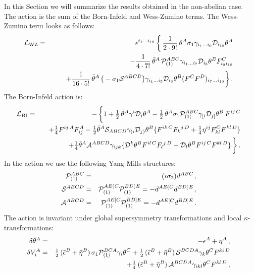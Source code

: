 \documentclass[12pt,a4paper]{article}
\def\half{{\textstyle {1 \over 2}}}
\def\quart{{\textstyle {1 \over 4}}}
\def\noverm#1#2{{\textstyle {#1 \over #2}}}
\def\Dpartial{{\cal D}}
\begin{document}
In this Section we will summarize the results obtained in the
non-abelian case.
The action is the sum of the Born-Infeld and Wess-Zumino terms.
The Wess-Zumino term looks as follows:
\begin{eqnarray}
    {\cal L}_{{\rm WZ}} &=& \epsilon^{i_1\ldots i_{10}} \,
     \bigg\{ \, {1\over 2\cdot 9!}\,\bar\theta^A\sigma_1
   \gamma_{i_1\ldots i_9}\Dpartial_{i_{10}}\theta^A
   \nonumber\\
   &&\quad - {1\over 4\cdot 7!}\,\bar\theta^A \, {\cal P}^{ABC}_{(1)}
      \gamma_{i_1\ldots i_{7}}\Dpartial_{i_{8}}\theta^B
       F^C_{i_9 i_{10}}
   \nonumber\\
\label{LWZall}
   &&\quad\quad + {1\over 16\cdot 5!}\,
   \bar\theta^A \, \big( - \sigma_1 {\cal S}^{ABCD} \big)
      \gamma_{i_1\ldots i_{5}}\Dpartial_{i_{6}}\theta^B
       (F^C F^D)_{i_{7}\ldots i_{10}} \bigg\}\,.
\end{eqnarray}
The Born-Infeld action is:
\begin{eqnarray}
    {\cal L}_{{\rm BI}} &=& -\,\bigg\{
    1 + \half\,\bar\theta^A\gamma^i\Dpartial_i\theta^A
       - \half\, \bar\theta^A \sigma_1 {\cal P}^{ABC}_{(1)}
       \gamma_{[i}\Dpartial_{j]}\theta^B\, F^{ij\,C}
     \nonumber\\
     &&\quad  + \noverm{1}{4} F^{ij\,A} F_{ij}^A
       - \noverm{1}{2} \bar\theta^A
       {\cal S}_{ABCD} \gamma_{(i}\Dpartial_{j)}\theta^B
           \{F^{ik\,C}F_{k}{}^{j\,D} + \quart \eta^{ij} F_{kl}^CF^{kl\,D}\}
     \nonumber\\
\label{LBIall}
     &&\quad    + \quart\bar\theta^A  {\cal A}^{ABCD}
                      \gamma_{ijk}
      \{\Dpartial^k\theta^B F^{il\,C} F_l{}^{j\,D}
         - \Dpartial_l\theta^B F^{ij\,C}F^{kl\,D}\} \,\bigg\} \,.
\end{eqnarray}
In the action we use the following Yang-Mills structures:
\begin{eqnarray}
\label{Pall}
    {\cal P}^{ABC}_{(1)} &=& (i\sigma_2)d^{ABC} \,,
    \\
\label{Sall}
    {\cal S}^{ABCD} &=& {\cal P}^{AE(C}_{(1)}{\cal P}^{BD)E}_{(1)}
                     =  -  d^{AE(C}d^{BD)E}\,,
    \\
\label{Aall}
    {\cal A}^{ABCD} &=&  {\cal P}^{AE[C}_{(1)}{\cal P}^{BD]E}_{(1)}
                      =  -d^{AE[C}d^{BD]E}\,.
\end{eqnarray}
The action is invariant under global supersymmetry transformations
and local $\kappa$-transformations:
\begin{eqnarray}
\label{dthall}
   \delta\bar\theta^A &=& - \bar\epsilon^A+\bar\eta^A\,,
   \\
\label{dVall}
   \delta V_i^A &=& \half\,
      (\bar\epsilon^B+\bar\eta^B)\,\sigma_1{\cal P}^{BCA}_{(1)}\gamma_i\theta^C
      +\half\,(\bar\epsilon^B+\bar\eta^B)\,
            {\cal S}^{BCDA} \gamma_k\theta^C F^{ki\,D}
      \nonumber\\
    &&\quad
     +\quart\,(\bar\epsilon^B+\bar\eta^B)\,{\cal A}^{BCDA}\gamma_{ikl}\theta^C
                F^{kl\,D}\,,
\end{eqnarray}
\end{document}
